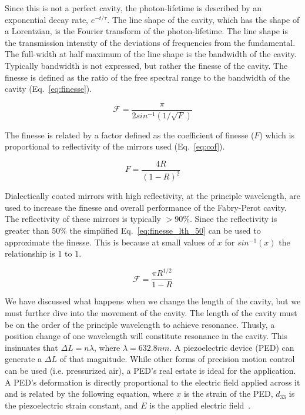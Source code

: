 \documentclass[12pt,journal]{IEEEtran}
\begin{document}
Since this is not a perfect cavity, the photon-lifetime is described by an exponential decay rate, $e^{-t/\tau}$. The line shape of the cavity, which has the shape of a Lorentzian, is the Fourier transform of the photon-lifetime. The line shape is the transmission intensity of the deviations of frequencies from the fundamental. The full-width at half maximum of the line shape is the bandwidth of the cavity. Typically bandwidth is not expressed, but rather the finesse of the cavity. The finesse is defined as the ratio of the free spectral range to the bandwidth of the cavity (Eq.~\ref{eq:finesse}). 

\begin{equation}
\mathcal{F} = \frac{\pi}{2sin^{-1}(1/\sqrt{F})}
\label{eq:finesse}
\end{equation}

The finesse is related by a factor defined as the coefficient of finesse ($F$) which is proportional to reflectivity of the mirrors used (Eq.~\ref{eq:cof}).

\begin{equation}
F = \frac{4R}{(1-R)^2}
\label{eq:cof}
\end{equation}  

Dialectically coated mirrors with high reflectivity, at the principle wavelength, are used to increase the finesse and overall performance of the Fabry-Perot cavity. The reflectivity of these mirrors is typically $>90\%$. Since the reflectivity is greater than 50\% the simplified Eq.~\ref{eq:finesse_lth_50} can be used to approximate the finesse. This is because at small values of $x$ for $sin^{-1}(x)$ the relationship is 1 to 1. 

\begin{equation}
\mathcal{F} = \frac{\pi R^{1/2}}{1-R}
\label{eq:finesse_lth_50}
\end{equation}   

We have discussed what happens when we change the length of the cavity, but we must further dive into the movement of the cavity. The length of the cavity must be on the order of the principle wavelength to achieve resonance. Thusly, a position change of one wavelength will constitute resonance in the cavity. This insinuates that $\Delta L = n\lambda$, where $\lambda = 632.8 nm$. A piezoelectric device (PED) can generate a $\Delta L$ of that magnitude. While other forms of precision motion control can be used (i.e. pressurized air), a PED's real estate is ideal for the application. A PED's deformation is directly proportional to the electric field applied across it and is related by the following equation, where $x$ is the strain of the PED, $d_{33}$ is the piezoelectric strain constant, and $E$ is the applied electric field~\cite{piezo}. 
\end{document}
